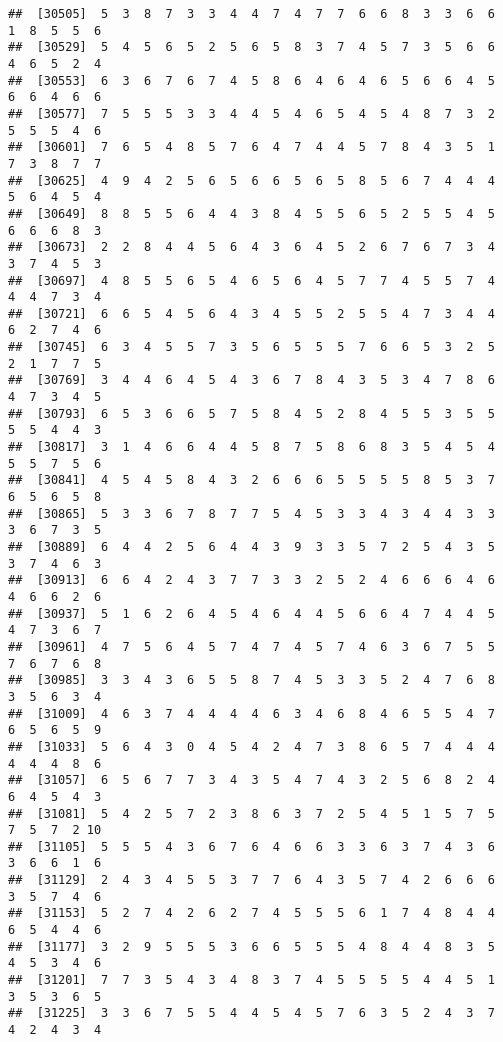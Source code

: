 \documentclass[
]{book}
\begin{document}
\begin{verbatim}
##  [30505]  5  3  8  7  3  3  4  4  7  4  7  7  6  6  8  3  3  6  6  1  8  5  5  6
##  [30529]  5  4  5  6  5  2  5  6  5  8  3  7  4  5  7  3  5  6  6  4  6  5  2  4
##  [30553]  6  3  6  7  6  7  4  5  8  6  4  6  4  6  5  6  6  4  5  6  6  4  6  6
##  [30577]  7  5  5  5  3  3  4  4  5  4  6  5  4  5  4  8  7  3  2  5  5  5  4  6
##  [30601]  7  6  5  4  8  5  7  6  4  7  4  4  5  7  8  4  3  5  1  7  3  8  7  7
##  [30625]  4  9  4  2  5  6  5  6  6  5  6  5  8  5  6  7  4  4  4  5  6  4  5  4
##  [30649]  8  8  5  5  6  4  4  3  8  4  5  5  6  5  2  5  5  4  5  6  6  6  8  3
##  [30673]  2  2  8  4  4  5  6  4  3  6  4  5  2  6  7  6  7  3  4  3  7  4  5  3
##  [30697]  4  8  5  5  6  5  4  6  5  6  4  5  7  7  4  5  5  7  4  4  4  7  3  4
##  [30721]  6  6  5  4  5  6  4  3  4  5  5  2  5  5  4  7  3  4  4  6  2  7  4  6
##  [30745]  6  3  4  5  5  7  3  5  6  5  5  5  7  6  6  5  3  2  5  2  1  7  7  5
##  [30769]  3  4  4  6  4  5  4  3  6  7  8  4  3  5  3  4  7  8  6  4  7  3  4  5
##  [30793]  6  5  3  6  6  5  7  5  8  4  5  2  8  4  5  5  3  5  5  5  5  4  4  3
##  [30817]  3  1  4  6  6  4  4  5  8  7  5  8  6  8  3  5  4  5  4  5  5  7  5  6
##  [30841]  4  5  4  5  8  4  3  2  6  6  6  5  5  5  5  8  5  3  7  6  5  6  5  8
##  [30865]  5  3  3  6  7  8  7  7  5  4  5  3  3  4  3  4  4  3  3  3  6  7  3  5
##  [30889]  6  4  4  2  5  6  4  4  3  9  3  3  5  7  2  5  4  3  5  3  7  4  6  3
##  [30913]  6  6  4  2  4  3  7  7  3  3  2  5  2  4  6  6  6  4  6  4  6  6  2  6
##  [30937]  5  1  6  2  6  4  5  4  6  4  4  5  6  6  4  7  4  4  5  4  7  3  6  7
##  [30961]  4  7  5  6  4  5  7  4  7  4  5  7  4  6  3  6  7  5  5  7  6  7  6  8
##  [30985]  3  3  4  3  6  5  5  8  7  4  5  3  3  5  2  4  7  6  8  3  5  6  3  4
##  [31009]  4  6  3  7  4  4  4  4  6  3  4  6  8  4  6  5  5  4  7  6  5  6  5  9
##  [31033]  5  6  4  3  0  4  5  4  2  4  7  3  8  6  5  7  4  4  4  4  4  4  8  6
##  [31057]  6  5  6  7  7  3  4  3  5  4  7  4  3  2  5  6  8  2  4  6  4  5  4  3
##  [31081]  5  4  2  5  7  2  3  8  6  3  7  2  5  4  5  1  5  7  5  7  5  7  2 10
##  [31105]  5  5  5  4  3  6  7  6  4  6  6  3  3  6  3  7  4  3  6  3  6  6  1  6
##  [31129]  2  4  3  4  5  5  3  7  7  6  4  3  5  7  4  2  6  6  6  3  5  7  4  6
##  [31153]  5  2  7  4  2  6  2  7  4  5  5  5  6  1  7  4  8  4  4  6  5  4  4  6
##  [31177]  3  2  9  5  5  5  3  6  6  5  5  5  4  8  4  4  8  3  5  4  5  3  4  6
##  [31201]  7  7  3  5  4  3  4  8  3  7  4  5  5  5  5  4  4  5  1  3  5  3  6  5
##  [31225]  3  3  6  7  5  5  4  4  5  4  5  7  6  3  5  2  4  3  7  4  2  4  3  4

\end{verbatim}
\end{document}
